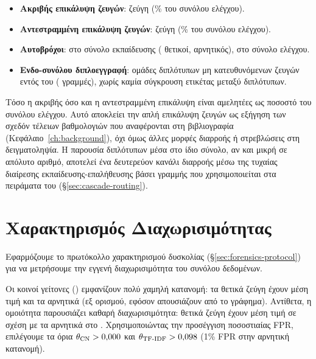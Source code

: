 \begin{itemize}
    \item \textbf{Ακριβής επικάλυψη ζευγών}: \LeakageExact{} ζεύγη (\LeakageExactPct\% του συνόλου ελέγχου).
    \item \textbf{Αντεστραμμένη επικάλυψη ζευγών}: \LeakageReversed{} ζεύγη (\LeakageReversedPct\% του συνόλου
    ελέγχου).
    \item \textbf{Αυτοβρόχοι}: \SelfLoopsTrain{} στο σύνολο εκπαίδευσης (\SelfLoopsTrainPos{} θετικοί, \SelfLoopsTrainNeg{} αρνητικός), \SelfLoopsTest{} στο σύνολο ελέγχου.
    \item \textbf{Ενδο-συνόλου διπλοεγγραφή}: \IntraTrainDuplicates{} ομάδες διπλότυπων μη
    κατευθυνόμενων ζευγών εντός του \texttt{} (\IntraTrainDuplicatesRows{} γραμμές), χωρίς
    καμία σύγκρουση ετικέτας μεταξύ διπλότυπων.
\end{itemize}

Τόσο η ακριβής όσο και η αντεστραμμένη επικάλυψη είναι αμελητέες ως ποσοστό του
συνόλου ελέγχου.
Αυτό αποκλείει την απλή επικάλυψη ζευγών ως εξήγηση των σχεδόν τέλειων
βαθμολογιών που αναφέρονται στη βιβλιογραφία (Κεφάλαιο~\ref{ch:background}),
όχι όμως άλλες μορφές διαρροής ή στρεβλώσεις στη δειγματοληψία.
Η παρουσία διπλότυπων μέσα στο ίδιο σύνολο, αν και μικρή σε
απόλυτο αριθμό, αποτελεί ένα δευτερεύον κανάλι διαρροής μέσω της τυχαίας
διαίρεσης εκπαίδευσης-επαλήθευσης βάσει γραμμής που χρησιμοποιείται στα
πειράματα του  (\S\ref{sec:cascade-routing}).


\section{Χαρακτηρισμός Διαχωρισιμότητας}
\label{sec:separability-results}

Εφαρμόζουμε το πρωτόκολλο χαρακτηρισμού δυσκολίας (\S\ref{sec:forensics-protocol})
για να μετρήσουμε την εγγενή διαχωρισιμότητα του συνόλου δεδομένων.

Οι κοινοί γείτονες () εμφανίζουν πολύ χαμηλή κατανομή: τα θετικά ζεύγη έχουν
μέση τιμή \StructCnMeanPos{} και τα αρνητικά \StructCnMeanNeg{} (εξ ορισμού, εφόσον απουσιάζουν από το γράφημα).
Αντίθετα, η ομοιότητα  παρουσιάζει καθαρή διαχωρισιμότητα: θετικά ζεύγη
έχουν μέση τιμή \StructTfidfMeanPos{} σε σχέση με τα αρνητικά στο \StructTfidfMeanNeg{}.
Χρησιμοποιώντας την
προσέγγιση ποσοστιαίας FPR, επιλέγουμε τα όρια $\theta_{\mathrm{CN}} > 0{,}000$ και
$\theta_{\mathrm{TF\text{-}IDF}} > 0{,}098$ (1\% FPR στην αρνητική κατανομή).

